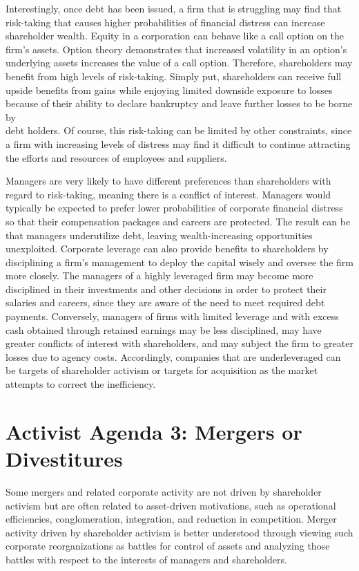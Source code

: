 \documentclass[11pt]{article}
\begin{document}
Interestingly, once debt has been issued, a firm that is struggling may find that risk-taking that causes higher probabilities of financial distress can increase shareholder wealth. Equity in a corporation can behave like a call option on the firm's assets. Option theory demonstrates that increased volatility in an option's underlying assets increases the value of a call option. Therefore, shareholders may benefit from high levels of risk-taking. Simply put, shareholders can receive full upside benefits from gains while enjoying limited downside exposure to losses because of their ability to declare bankruptcy and leave further losses to be borne by\\
debt holders. Of course, this risk-taking can be limited by other constraints, since a firm with increasing levels of distress may find it difficult to continue attracting the efforts and resources of employees and suppliers.

Managers are very likely to have different preferences than shareholders with regard to risk-taking, meaning there is a conflict of interest. Managers would typically be expected to prefer lower probabilities of corporate financial distress so that their compensation packages and careers are protected. The result can be that managers underutilize debt, leaving wealth-increasing opportunities unexploited. Corporate leverage can also provide benefits to shareholders by disciplining a firm's management to deploy the capital wisely and oversee the firm more closely. The managers of a highly leveraged firm may become more disciplined in their investments and other decisions in order to protect their salaries and careers, since they are aware of the need to meet required debt payments. Conversely, managers of firms with limited leverage and with excess cash obtained through retained earnings may be less disciplined, may have greater conflicts of interest with shareholders, and may subject the firm to greater losses due to agency costs. Accordingly, companies that are underleveraged can be targets of shareholder activism or targets for acquisition as the market attempts to correct the inefficiency.

\section*{Activist Agenda 3: Mergers or Divestitures}
Some mergers and related corporate activity are not driven by shareholder activism but are often related to asset-driven motivations, such as operational efficiencies, conglomeration, integration, and reduction in competition. Merger activity driven by shareholder activism is better understood through viewing such corporate reorganizations as battles for control of assets and analyzing those battles with respect to the interests of managers and shareholders.
\end{document}
